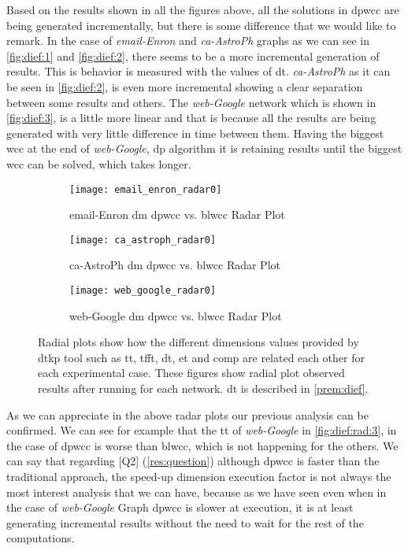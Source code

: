 Based on the results shown in all the figures above, all the solutions in \acrshort{dpwcc} are being generated incrementally, but there is some difference that we would like to remark. 
In the case of \emph{email-Enron} and \emph{ca-AstroPh} graphs as we can see in \autoref{fig:dief:1} and \autoref{fig:dief:2}, there seems to be a more incremental generation of results. 
This is behavior is measured with the values of \acrfull{dt}. \emph{ca-AstroPh} as it can be seen in \autoref{fig:dief:2}, is even more incremental showing a clear separation between some results and others. 
The \emph{web-Google} network which is shown in \autoref{fig:dief:3}, is a little more linear and that is because all the results are being generated with very little difference in time between them. 
Having the biggest \acrshort{wcc} at the end of \emph{web-Google}, \acrshort{dp} algorithm it is retaining results until the biggest \acrshort{wcc} can be solved, which takes longer. 


\begin{figure}[!htp]
  \centering
  \begin{subfigure}[t]{0.3\textwidth}
   \texttt{[image: email\_enron\_radar0]}
   \caption{email-Enron \acrlong{dm} \acrshort{dpwcc} vs. \acrshort{blwcc} Radar Plot}
   \label{fig:dief:rad:1}
  \end{subfigure}\hfill
  \begin{subfigure}[t]{0.3\textwidth}
   \texttt{[image: ca\_astroph\_radar0]}
   \caption{ca-AstroPh \acrlong{dm} \acrshort{dpwcc} vs. \acrshort{blwcc} Radar Plot}
   \label{fig:dief:rad:2}
  \end{subfigure}\hfill
  \begin{subfigure}[t]{0.3\textwidth}
   \texttt{[image: web\_google\_radar0]}
   \caption{web-Google \acrlong{dm} \acrshort{dpwcc} vs. \acrshort{blwcc} Radar Plot}
   \label{fig:dief:rad:3}
  \end{subfigure}\hfill
   \caption{Radial plots show how the different dimensions values provided by \acrshort{dtkp} tool such as \acrshort{tt}, \acrshort{tfft}, \acrshort{dt}, \acrshort{et} and \acrshort{comp} are related each other for each experimental case. These figures show radial plot observed results after running for each network. \acrshort{dt} is described in \autoref{prem:dief}.}
   \label{fig:dief:radial:old:all}
 \end{figure}

As we can appreciate in the above radar plots our previous analysis can be confirmed. We can see for example that the \acrlong{tt} of \emph{web-Google} in \autoref{fig:dief:rad:3}, in the case of \acrshort{dpwcc} is worse than \acrshort{blwcc}, which is not happening for the others.
We can say that regarding [Q2] (\autoref{res:question}) although \acrshort{dpwcc} is faster than the traditional approach, the speed-up dimension execution factor is not always the most interest analysis that we can have, because as we have seen even when in the case of \emph{web-Google} Graph \acrshort{dpwcc} is slower at execution, it is at least generating incremental results without the need to wait for the rest of the computations.

